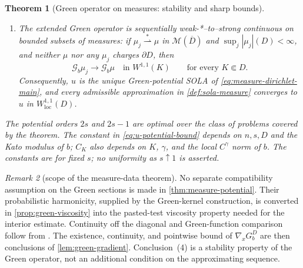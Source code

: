 \documentclass[reqno]{amsart}
\numberwithin{equation}{section}
\theoremstyle{plain}
\newtheorem{theorem}{Theorem}[section]
\theoremstyle{definition}
\theoremstyle{remark}
\newtheorem{remark}[theorem]{Remark}
\newcommand{\M}{\mathcal M}
\newcommand{\rev}[1]{#1}
\begin{document}
\begin{theorem}[\rev{Green operator on measures: stability and sharp bounds}]
\begin{enumerate}
\item \rev{The extended Green operator is sequentially weak-*--to--strong
continuous on bounded subsets of measures: if
$\mu_j\stackrel{*}{\rightharpoonup}\mu$ in $\M(\overline D)$ and
$\sup_j|\mu_j|(D)<\infty$, and neither $\mu$ nor any $\mu_j$ charges
$\partial D$, then}
\begin{equation}\label{eq:green-measure-stability}
 \mathcal G_b\mu_j\longrightarrow\mathcal G_b\mu
 \quad\text{in }W^{1,1}(K)
 \qquad\text{for every }K\Subset D.
\end{equation}
\rev{Consequently, $u$ is the unique Green-potential SOLA of
\eqref{eq:measure-dirichlet-main}, and every admissible approximation in
\cref{def:sola-measure} converges to $u$ in
$W^{1,1}_{\mathrm{loc}}(D)$.}
\end{enumerate}
\rev{The potential orders $2s$ and $2s-1$ are optimal over the class of
problems covered by the theorem.  The constant in
\eqref{eq:u-potential-bound} depends on $n,s,D$ and the Kato modulus of
$b$; $C_K$ also depends on $K$, $\gamma$, and the local $C^\gamma$ norm of
$b$.}  The constants are for fixed $s$; no uniformity as $s\uparrow1$ is
asserted.
\endgroup
\end{theorem}

\begin{remark}[scope of the measure-data theorem]
\label{rem:measure-scope}
\rev{No separate compatibility assumption on the Green sections is made in
\cref{thm:measure-potential}.  Their probabilistic harmonicity, supplied by
the Green-kernel construction, is converted in
\cref{prop:green-viscosity} into the pasted-test viscosity property needed
for the interior estimate.  Continuity off the diagonal and Green-function
comparison follow from \cite[Lemma~7 and Theorem~1]{BogdanJakubowski2012}.
The existence, continuity, and pointwise bound of $\nabla_xG_b^D$ are then
conclusions of \cref{lem:green-gradient}.  Conclusion~(4) is a stability
property of the Green operator, not an additional condition on the
approximating sequence.}
\end{remark}
\end{document}
